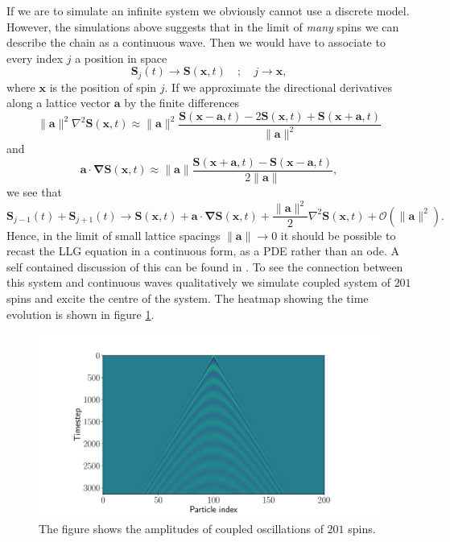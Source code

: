 If we are to simulate an infinite system we obviously cannot use a discrete model. However, the simulations above suggests that in the limit of \textit{many} spins we can describe the chain as a continuous wave. Then we would have to associate to every index $j$ a position in space 
$$
	\mathbf{S}_j(t) \to \mathbf{S}(\mathbf{x},t) \quad ; \quad j \to \mathbf{x},
$$
where $\mathbf{x}$ is the position of spin $j$.
If we approximate the directional derivatives along a lattice vector $\mathbf{a}$ by the finite differences 
$$
	 \|\mathbf{a}\|^2  \nabla^2 \mathbf{S}(\mathbf{x},t) \approx \|\mathbf{a}\|^2 \frac{\mathbf{S}(\mathbf{x} - \mathbf{a},t) - 2 \mathbf{S}(\mathbf{x},t) + \mathbf{S}(\mathbf{x} + \mathbf{a},t) }{ \| \mathbf{a} \|^2}
$$
and 
$$
	\mathbf{a} \cdot \boldsymbol{\nabla} \mathbf{S}(\mathbf{x},t) \approx \|\mathbf{a}\| \frac{\mathbf{S}(\mathbf{x}+\mathbf{a},t) - \mathbf{S}(\mathbf{x}-\mathbf{a},t)}{2\|\mathbf{a}\|},
$$
we see that 
$$
	\mathbf{S}_{j-1}(t) + \mathbf{S}_{j+1}(t) \to \mathbf{S}(\mathbf{x},t) + \mathbf{a} \cdot \boldsymbol{\nabla} \mathbf{S}(\mathbf{x},t) + \frac{\| \mathbf{a} \|^2}{2} \nabla^2 \mathbf{S}(\mathbf{x},t) + \mathcal{O}(\|\mathbf{a}\|^2).
$$
Hence, in the limit of small lattice spacings $\|\mathbf{a}\| \to 0$ it should be possible to recast the LLG equation in a continuous form, as a PDE rather than an ode. A self contained discussion of this can be found in \cite{Lakshmanan2011}. To see the connection between this system and continuous waves qualitatively we simulate coupled system of $201$ spins and excite the centre of the system. The heatmap showing the time evolution is shown in figure \ref{fig:200_heat}.

\begin{figure}[htb]
	\centering
	\includegraphics[width=\columnwidth]{../fig/wave_200.pdf}
	\caption{The figure shows the amplitudes of coupled oscillations of $201$ spins.}
	\label{fig:200_heat}
\end{figure}

